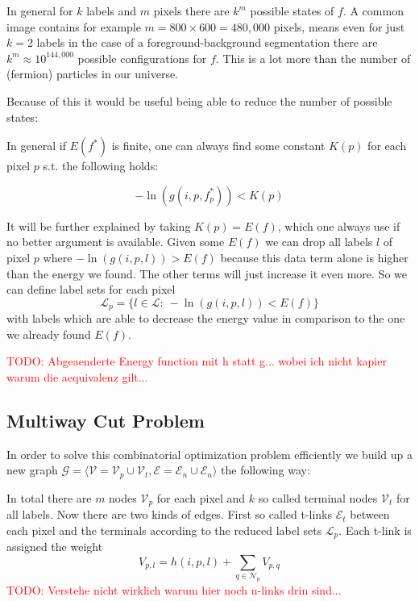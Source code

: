 \documentclass{scrartcl}[12pt, halfparskip]
\newcommand{\todo}[1]{\textcolor{red}{TODO: #1}}
\begin{document}
In general for $k$ labels and $m$ pixels there are $k^m$ possible states of $f$. A common image contains for example $m = 800 \times 600 = 480,000$ pixels, means even for just $k = 2$ labels in the case of a foreground-background segmentation there are $k^m \approx 10^{144,000}$ possible configurations for $f$. This is a lot more than the number of (fermion) particles in our universe.

Because of this it would be useful being able to reduce the number of possible states:

In general if $E(f^*)$ is finite, one can always find some constant $K(p)$ for each pixel $p$ s.t. the following holds:

\begin{equation}
	- \ln(g(i, p, f_p^*)) < K(p)
\end{equation}

It will be further explained by taking $K(p) = E(f)$, which one always use if no better argument is available. Given some $E(f)$ we can drop all labels $l$ of pixel $p$ where $- \ln(g(i, p, l)) > E(f)$ because this data term alone is higher than the energy we found. The other terms will just increase it even more. So we can define label sets for each pixel
\begin{equation}
	\mathcal{L}_p = \{l \in \mathcal{L}: \ - \ln(g(i, p, l)) < E(f) \}
\end{equation}
with labels which are able to decrease the energy value in comparison to the one we already found $E(f)$.

\todo{Abgeaenderte Energy function mit h statt g... wobei ich nicht kapier warum die aequivalenz gilt...}


\subsection{Multiway Cut Problem}
In order to solve this combinatorial optimization problem efficiently we build up a new graph $\mathcal{G} = \langle \mathcal{V} = \mathcal{V}_p \cup \mathcal{V}_t, \mathcal{E} = \mathcal{E}_n \cup \mathcal{E}_n \rangle$ the following way:

In total there are $m$ nodes $\mathcal{V}_p$ for each pixel and $k$ so called terminal nodes $\mathcal{V}_t$ for all labels. Now there are two kinds of edges. First so called t-links $\mathcal{E}_t$ between each pixel and the terminals according to the reduced label sets $\mathcal{L}_p$. Each t-link is assigned the weight
\begin{equation}
	V_{p,l} = h(i,p,l) + \sum\limits_{q \in \mathcal{N}_p} V_{p,q}
\end{equation}
\todo{Verstehe nicht wirklich warum hier noch n-links drin sind...}
\end{document}
